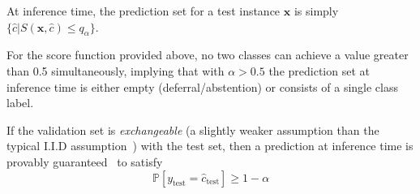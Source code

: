 At inference time, the prediction set for a test instance $\mathbf{x}$ is simply $\{\hat{c}| S(\mathbf{x}, \hat{c}) \leq q_\alpha\}$. 

For the score function provided above, no two classes can achieve a value greater than 0.5 simultaneously, implying that with $\alpha>0.5$ the prediction set at inference time is either empty (deferral/abstention) or consists of a single class label.

If the validation set is \textit{exchangeable} (a slightly weaker assumption than the typical I.I.D assumption~\citep{bernardo1996concept}) with the test set, then a prediction at inference time is provably guaranteed~\citep{shafer2008tutorial} to satisfy
\begin{equation}
    \mathbb{P}[y_\text{test}=\hat{c}_{\text{test}}] \geq 1-\alpha
\end{equation}